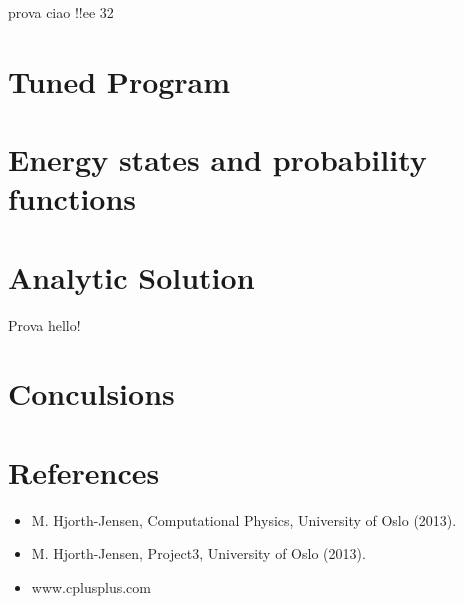 \documentclass[a4paper]{article}
\begin{document}
prova ciao !!ee
32
\section{Tuned Program}
\section{Energy states and probability functions}\label{2electrons}

\pagebreak
\section{Analytic Solution}
Prova hello!
\pagebreak
\section{Conculsions}

\section{References}
\begin{itemize}
\item M. Hjorth-Jensen, 
Computational Physics, University of Oslo (2013).
\item M. Hjorth-Jensen, 
Project3, University of Oslo (2013).
\item www.cplusplus.com
\end{itemize}
\end{document}
